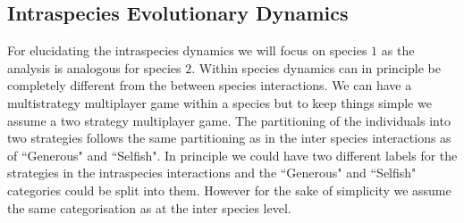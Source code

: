 \documentclass[12pt]{article}
\newcommand{\marcus}[1]{\textcolor{darkred}{(#1)}}
\begin{document}
\begin{appendices}
\section{Intraspecies Evolutionary Dynamics}
\label{appB}

For elucidating the intraspecies dynamics we will focus on species $1$ as the analysis is analogous for species $2$.
Within species dynamics can in principle be completely different from the between species interactions. 
We can have a multistrategy multiplayer game within a species but to keep things simple we assume a two strategy multiplayer game.
The partitioning of the individuals into two strategies follows the same partitioning as in the inter species interactions as of ``Generous" and ``Selfish". 
In principle we could have two different labels for the strategies in the intraspecies interactions and the ``Generous" and ``Selfish" categories could be split into them.
However for the sake of simplicity we assume the same categorisation as at the inter species level.


\end{appendices}
\end{document}
